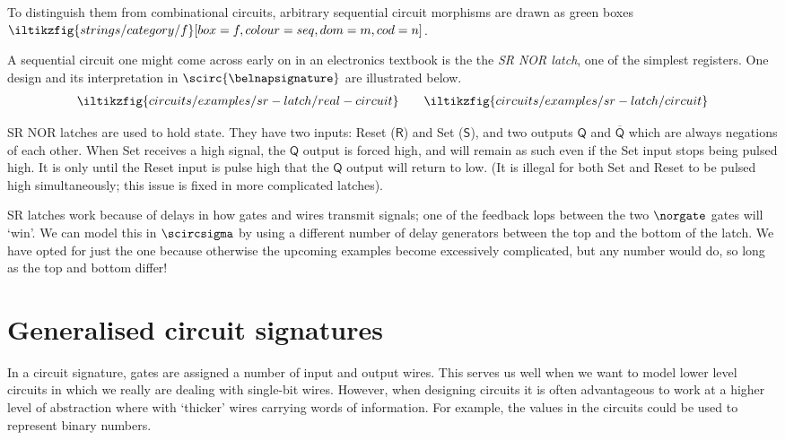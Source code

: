To distinguish them from combinational circuits, arbitrary sequential circuit
morphisms are drawn as green boxes \(
\iltikzfig{strings/category/f}[box=f,colour=seq,dom=m,cod=n]
\).

\begin{example}[SR latch]\label{ex:sr-latch}
    A sequential circuit one might come across early on in an electronics
    textbook is the the \emph{SR NOR latch}, one of the simplest registers.
    One design and its interpretation in \(\scirc{\belnapsignature}\) are
    illustrated below.
    \begin{gather*}
        \iltikzfig{circuits/examples/sr-latch/real-circuit}
        \qquad
        \iltikzfig{circuits/examples/sr-latch/circuit}
    \end{gather*}

    SR NOR latches are used to hold state.
    They have two inputs: Reset (\(\mathsf{R}\)) and Set (\(\mathsf{S}\)), and
    two outputs \(\mathsf{Q}\) and \(\overline{\mathsf{Q}}\) which are always
    negations of each other.
    When Set receives a high signal, the \(\mathsf{Q}\) output is forced high,
    and will remain as such even if the Set input stops being pulsed high.
    It is only until the Reset input is pulse high that the \(\mathsf{Q}\)
    output will return to low.
    (It is illegal for both Set and Reset to be pulsed high simultaneously; this
    issue is fixed in more complicated latches).

    SR latches work because of delays in how gates and wires transmit signals;
    one of the feedback lops between the two \(\norgate\) gates will `win'.
    We can model this in \(\scircsigma\) by using a different number of delay
    generators between the top and the bottom of the latch.
    We have opted for just the one because otherwise the upcoming examples
    become excessively complicated, but any number would do, so long as the top
    and bottom differ!
\end{example}

\section{Generalised circuit signatures}

In a circuit signature, gates are assigned a number of input and output wires.
This serves us well when we want to model lower level circuits in which we
really are dealing with single-bit wires.
However, when designing circuits it is often advantageous to work at a higher
level of abstraction where with `thicker' wires carrying words of information.
For example, the values in the circuits could be used to represent binary
numbers.

